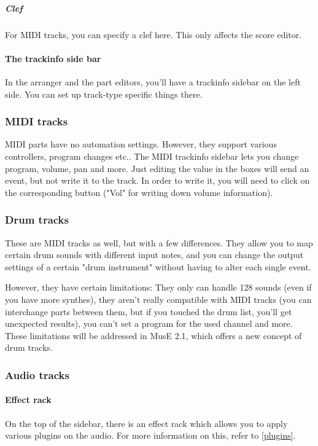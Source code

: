 \documentclass[a4paper]{report}
\begin{document}
\subparagraph{Clef} For MIDI tracks, you can specify a clef here. This
only affects the score editor.

\paragraph{The trackinfo side bar}
In the arranger and the part editors, you'll have a trackinfo sidebar
on the left side. You can set up track-type specific things there.

\subsubsection{MIDI tracks}
MIDI parts have no automation settings. However, they support various     %
controllers, program changes etc.. The MIDI trackinfo sidebar lets you
change program, volume, pan and more. Just editing the value in the
boxes will send an event, but not write it to the track. In order to
write it, you will need to click on the corresponding button ("Vol" for
writing down volume information).

\subsubsection{Drum tracks}
These are MIDI tracks as well, but with a few differences. They allow
you to map certain drum sounds with different input notes, and you
can change the output settings of a certain "drum instrument" without
having to alter each single event.

However, they have certain limitations: They only can handle 128 sounds
(even if you have more synthes), they aren't really compatible with
MIDI tracks (you can interchange parts between them, but if you touched
the drum list, you'll get unexpected results), you can't set a program
for the used channel and more. These limitations will be addressed in
MusE 2.1, which offers a new concept of drum tracks.

\subsubsection{Audio tracks}
\paragraph{Effect rack}
On the top of the sidebar, there is an effect rack which allows you to
apply various plugins on the audio. For more information on this, refer
to \ref{plugins}.
\end{document}
